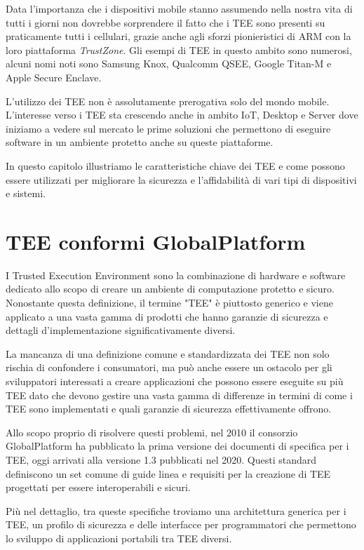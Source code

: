 \documentclass[12pt,italian]{report}
\begin{document}
Data l'importanza che i dispositivi mobile stanno assumendo nella nostra
vita di tutti i giorni non dovrebbe sorprendere il fatto che i TEE sono
presenti su praticamente tutti i cellulari, grazie anche agli sforzi
pionieristici di ARM con la loro piattaforma \textit{TrustZone}.
Gli esempi di TEE in questo ambito sono numerosi, alcuni nomi noti sono
Samsung Knox, Qualcomm QSEE, Google Titan-M e Apple Secure Enclave.

L'utilizzo dei TEE non è assolutamente prerogativa solo del mondo mobile.
L'interesse verso i TEE sta crescendo anche in ambito IoT, Desktop e Server 
dove iniziamo a vedere sul mercato le prime soluzioni che permettono di
eseguire software in un ambiente protetto anche su queste piattaforme.

In questo capitolo illustriamo le caratteristiche chiave dei TEE e come
possono essere utilizzati per migliorare la sicurezza e l'affidabilità di
vari tipi di dispositivi e sistemi.

\section{TEE conformi GlobalPlatform}
\label{sec:tee-conformi-globalplatform}
I Trusted Execution Environment sono la combinazione di hardware e software
dedicato allo scopo di creare un ambiente di computazione protetto e sicuro.
Nonostante questa definizione, il termine "TEE" è piuttosto generico
e viene applicato a una vasta gamma di prodotti che hanno garanzie di sicurezza
e dettagli d'implementazione significativamente diversi.

La mancanza di una definizione comune e standardizzata dei TEE non solo rischia
di confondere i consumatori, ma può anche essere un ostacolo per gli sviluppatori
interessati a creare applicazioni che possono essere eseguite su più TEE
dato che devono gestire una vasta gamma di differenze in termini di come i
TEE sono implementati e quali garanzie di sicurezza effettivamente offrono.

Allo scopo proprio di risolvere questi problemi, nel 2010 il consorzio
GlobalPlatform ha pubblicato la prima versione dei documenti di specifica
per i TEE, oggi arrivati alla versione 1.3 pubblicati nel 2020.
Questi standard definiscono un set comune di guide linea e requisiti per la
creazione di TEE progettati per essere interoperabili e sicuri.

Più nel dettaglio, tra queste specifiche troviamo una architettura
generica per i TEE, un profilo di sicurezza e delle interfacce per
programmatori che permettono lo sviluppo di applicazioni portabili tra TEE
diversi. 
\end{document}
